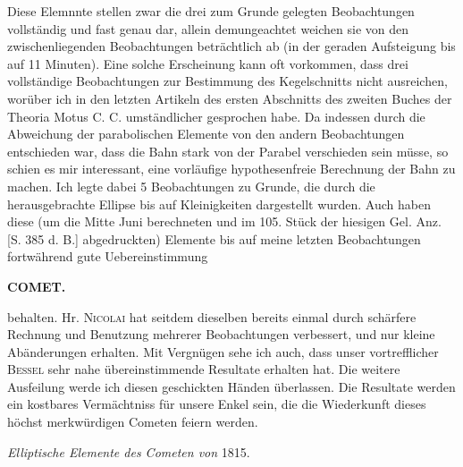 \par\indent Diese Elemnnte 
stellen zwar die drei zum Grunde gelegten Beobachtungen vollständig und fast genau
dar, allein demungeachtet weichen sie von den zwischenliegenden Beobachtungen beträchtlich ab (in
der geraden Aufsteigung bis auf 11 Minuten). Eine solche Erscheinung kann oft vorkommen, dass
drei vollständige Beobachtungen zur Bestimmung des Kegelschnitts nicht ausreichen, worüber ich in
den letzten Artikeln des ersten Abschnitts des zweiten Buches der Theoria Motus C. C.
umständlicher gesprochen habe. Da indessen durch die Abweichung der parabolischen Elemente von den
andern Beobachtungen entschieden war, dass die Bahn stark von der Parabel verschieden sein müsse,
so schien es mir interessant, eine vorläufige hypothesenfreie Berechnung der Bahn zu machen. Ich
legte dabei 5 Beobachtungen zu Grunde, die durch die herausgebrachte Ellipse bis auf Kleinigkeiten
dargestellt wurden. Auch haben diese (um die Mitte Juni berechneten und im 105. Stück der
hiesigen Gel. Anz. [S. 385 d. B.] abgedruckten) Elemente bis auf meine letzten Beobachtungen
fortwährend gute Uebereinstimmung
\par
\clearpage
\thispagestyle{empty}
\noindent{}%
\makebox[12mm][l]{}%
\parbox[t]{\dimexpr\linewidth-24mm\relax}{\centering\footnotesize\bfseries COMET.\par}%
\par\nobreak\medskip
\noindent behalten. Hr. \textsc{Nicolai} hat seitdem dieselben bereits einmal durch schärfere Rechnung und Benutzung
mehrerer Beobachtungen verbessert, und nur kleine Abänderungen erhalten. Mit Vergnügen sehe ich
auch, dass unser vortrefflicher \textsc{Bessel} sehr nahe übereinstimmende Resultate erhalten hat. Die weitere
Ausfeilung werde ich diesen geschickten Händen überlassen. Die Resultate werden ein kostbares Vermächtniss für unsere Enkel sein, die die Wiederkunft dieses höchst merkwürdigen Cometen feiern werden.

\begin{center}
\emph{Elliptische Elemente des Cometen von} 1815.
\end{center}

